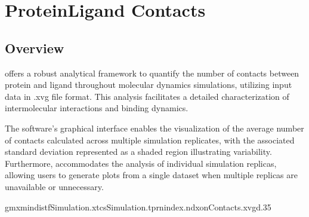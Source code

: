 \documentclass[a4paper,10pt,english]{sphinxmanual}
\begin{document}
\sphinxstepscope


\chapter{Protein\sphinxhyphen{}Ligand Contacts}
\label{\detokenize{Contacts:protein-ligand-contacts}}\label{\detokenize{Contacts::doc}}

\section{Overview}
\label{\detokenize{Contacts:overview}}
\sphinxAtStartPar
{} offers a robust analytical framework to quantify the number of contacts between protein and ligand throughout molecular dynamics simulations, utilizing input data in .xvg file format. This analysis facilitates a detailed characterization of intermolecular interactions and binding dynamics.

\sphinxAtStartPar
The software’s graphical interface enables the visualization of the average number of contacts calculated across multiple simulation replicates, with the associated standard deviation represented as a shaded region illustrating variability. Furthermore,  accommodates the analysis of individual simulation replicas, allowing users to generate plots from a single dataset when multiple replicas are unavailable or unnecessary.

\sphinxAtStartPar
{}

\begin{sphinxVerbatim}[commandchars=\\\{\}]
gmxmindist\PYGZhy{}fSimulation.xtc\PYGZhy{}sSimulation.tpr\PYGZhy{}nindex.ndx\PYGZhy{}onContacts.xvg\PYGZhy{}d.35
\end{sphinxVerbatim}

\begin{sphinxVerbatim}[commandchars=\\\{\}]
   
\end{sphinxVerbatim}
\end{document}
